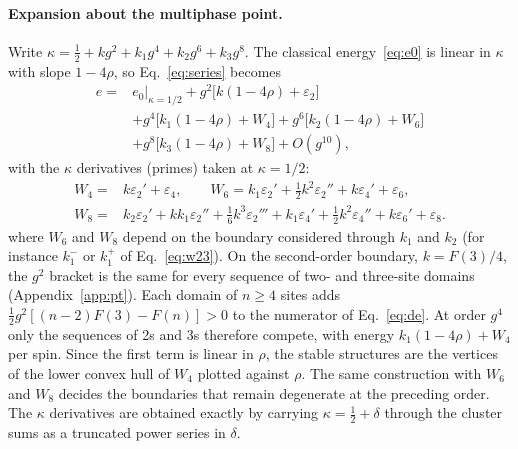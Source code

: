 \documentclass[
 aps,prb,
 twocolumn,
 superscriptaddress,
 longbibliography,
 nofootinbib,
 floatfix
]{revtex4-2}
\begin{document}
\paragraph*{Expansion about the multiphase point.}
Write $\kappa=\tfrac12+kg^2+k_1g^4+k_2g^6+k_3g^8$. The classical energy~\eqref{eq:e0} is linear in $\kappa$ with
slope $1-4\rho$, so Eq.~\eqref{eq:series} becomes
\begin{align}
e={}&e_0\big|_{\kappa=1/2}+g^2\big[k(1-4\rho)+\varepsilon_2\big]\nonumber\\
&+g^4\big[k_1(1-4\rho)+W_4\big]+g^6\big[k_2(1-4\rho)+W_6\big]\nonumber\\
&+g^8\big[k_3(1-4\rho)+W_8\big]+O(g^{10}),
\label{eq:expand}
\end{align}
with the $\kappa$ derivatives (primes) taken at $\kappa=1/2$:
\begin{align}
W_4={}&k\varepsilon_2'+\varepsilon_4,\qquad
W_6=k_1\varepsilon_2'+\tfrac12k^2\varepsilon_2''+k\varepsilon_4'+\varepsilon_6,\nonumber\\
W_8={}&k_2\varepsilon_2'+kk_1\varepsilon_2''+\tfrac16k^3\varepsilon_2'''+k_1\varepsilon_4'+\tfrac12k^2\varepsilon_4''
+k\varepsilon_6'+\varepsilon_8 .
\label{eq:W}
\end{align}
where $W_6$ and $W_8$ depend on the boundary considered through $k_1$ and $k_2$ (for instance $k_1^-$ or $k_1^+$ of
Eq.~\eqref{eq:w23}). On the second-order boundary, $k=F(3)/4$, the $g^2$ bracket is the same for every sequence of two- and
three-site domains (Appendix~\ref{app:pt}). Each domain of $n\ge4$ sites adds $\tfrac12g^2[(n-2)F(3)-F(n)]>0$
to the numerator of Eq.~\eqref{eq:de}.
At order $g^4$ only the sequences of 2s and 3s therefore compete, with energy
$k_1(1-4\rho)+W_4$ per spin. Since the first term is linear in $\rho$, the stable structures are the vertices
of the lower convex hull of $W_4$ plotted against $\rho$. The same construction with $W_6$ and $W_8$ decides
the boundaries that remain degenerate at the preceding order. The $\kappa$ derivatives are obtained exactly by
carrying $\kappa=\tfrac12+\delta$ through the cluster sums as a truncated power series in $\delta$.
\end{document}
